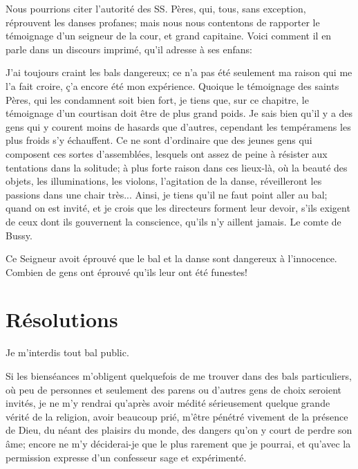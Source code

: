 \documentclass[instructions.tex]{subfiles}
\begin{document}
Nous pourrions citer l'autorité des SS. Pères, qui, tous, sans exception, réprouvent les danses profanes; mais nous nous contentons de rapporter le témoignage d'un seigneur de la cour, et grand capitaine. Voici comment il en parle dans un discours imprimé, qu'il adresse à ses enfans:

J'ai toujours craint les bals dangereux; ce n'a pas été seulement ma raison qui me l'a fait croire, ç'a encore été mon expérience. Quoique le témoignage des saints Pères, qui les condamnent soit bien fort, je tiens que, sur ce chapitre, le témoignage d'un courtisan doit être de plus grand poids. Je sais bien qu'il y a des gens qui y courent moins de hasards que d'autres, cependant les tempéramens les plus froids s'y échauffent. Ce ne sont d'ordinaire que des jeunes gens qui composent ces sortes d'assemblées, lesquels ont assez de peine à résister aux tentations dans la solitude; à plus forte raison dans ces lieux-là, où la beauté des objets, les illuminations, les violons, l'agitation de la danse, réveilleront les passions dans une chair très... Ainsi, je tiens qu'il ne faut point aller au bal; quand on est invité, et je crois que les directeurs forment leur devoir, s'ils exigent de ceux dont ils gouvernent la conscience, qu'ils n'y aillent jamais. Le comte de Bussy.

Ce Seigneur avoit éprouvé que le bal et la danse sont dangereux à l'innocence. Combien de gens ont éprouvé qu'ils leur ont été funestes!

\section{Résolutions}

\primo Je m'interdis tout bal public.

\secundo Si les bienséances m'obligent quelquefois de me trouver dans des bals particuliers, où peu de personnes et seulement des parens ou d'autres gens de choix seroient invités, je ne m'y rendrai qu'après avoir médité sérieusement quelque grande vérité de la religion, avoir beaucoup prié, m'être pénétré vivement de la présence de Dieu, du néant des plaisirs du monde, des dangers qu'on y court de perdre son âme; encore ne m'y déciderai-je que le plus rarement que je pourrai, et qu'avec la permission expresse d'un confesseur sage et expérimenté. 

 
\end{document}
